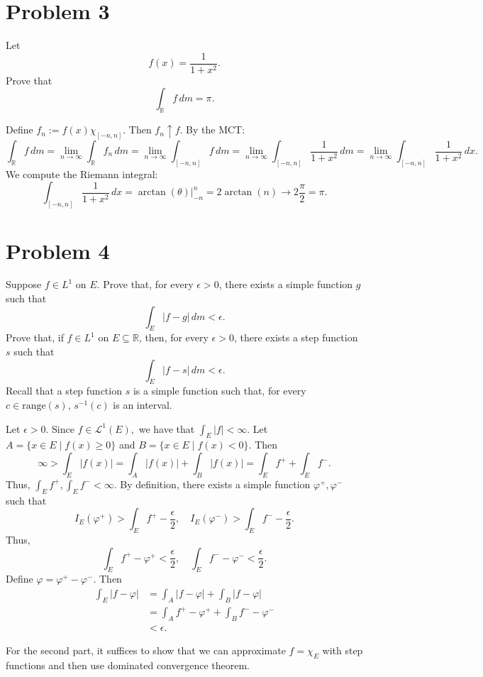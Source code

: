 \documentclass[11pt]{article}
\newcommand{\bbR}{\mathbb{R}}
\begin{document}
\section*{Problem 3}
Let 
\[
f(x) = \frac{1}{1 + x^2}.
\]
Prove that 
\[
\int_{\mathbb{R}} f \, dm = \pi.
\]

\begin{solution}
    Define $f_n := f(x)\chi_{[-n, n]}.$ Then $f_n \uparrow f.$ By the MCT:
    \[\int_\bbR f\, dm= \lim_{n\to \infty} \int_\bbR f_n \, dm= \lim_{n\to \infty} \int_{[-n,n]} f \, dm = \lim_{n\to \infty} \int_{[-n, n]}  \frac{1}{1 + x^2} \, dm = \lim_{n\to \infty} \int_{[-n, n]}  \frac{1}{1 + x^2} \, dx.\] We compute the Riemann integral:
    \[\int_{[-n, n]}  \frac{1}{1 + x^2} \, dx = \arctan(\theta)\bigg|_{-n}^n= 2 \arctan(n) \to 2\frac{\pi}{2} = \pi.\]
\end{solution}

\newpage

\section*{Problem 4}
Suppose \( f \in L^1 \) on \( E \). Prove that, for every \( \epsilon > 0 \), there exists a simple function \( g \) such that 
\[
\int_{E} |f - g| \, dm < \epsilon.
\]
Prove that, if \( f \in L^1 \) on \( E \subseteq \mathbb{R} \), then, for every \( \epsilon > 0 \), there exists a step function \( s \) such that 
\[
\int_{E} |f - s| \, dm < \epsilon.
\]
Recall that a step function \( s \) is a simple function such that, for every \( c \in \text{range}(s) \), \( s^{-1}(c) \) is an interval.
\begin{solution}
     Let $\epsilon>0.$ Since $f\in \mathcal{L}^1(E),$ we have that $\int_E |f|< \infty.$ Let $A = \{x \in E \mid f(x) \geq 0\}$ and $B = \{x \in E \mid f(x) < 0\}.$ Then 
    \[\infty >\int_E |f(x)|  = \int_A |f(x)| + \int_B |f(x)| = \int_E f^+ + \int_E f^-.\] Thus, $\int_E f^+, \int_E f^- < \infty.$ By definition, there exists a simple function $\varphi^+, \varphi^-$ such that 
    \[I_E(\varphi^+) > \int_E f^+ -\frac{\epsilon}{2}, \quad I_E(\varphi^-) > \int_E f^- - \frac{\epsilon}{2}.\]
    Thus, 
    \[\int_E f^+ - \varphi^+ < \frac{\epsilon}{2}, \quad \int_E f^-  - \varphi^- < \frac{\epsilon}{2}.\] Define $\varphi = \varphi^+ - \varphi^-.$ Then
    \begin{align*}
        \int_E |f  - \varphi| &= \int_A |f - \varphi| +  \int_B |f - \varphi|\\
        &= \int_A f^+ - \varphi^+ + \int_B f^- - \varphi^-\\
        &< \epsilon.
    \end{align*}

    For the second part, it suffices to show that we can approximate $f= \chi_E$ with step functions and then use dominated convergence theorem.
\end{solution}
\end{document}
